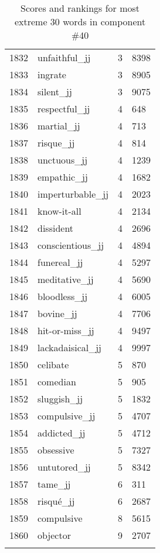 \begin{longtable}[!htbp]{| rlr@{.}l |}
    1832 & unfaithful\_jj & 3 & 8398 \\
    1833 & ingrate & 3 & 8905 \\
    1834 & silent\_jj & 3 & 9075 \\
    1835 & respectful\_jj & 4 & 648 \\
    1836 & martial\_jj & 4 & 713 \\
    1837 & risque\_jj & 4 & 814 \\
    1838 & unctuous\_jj & 4 & 1239 \\
    1839 & empathic\_jj & 4 & 1682 \\
    1840 & imperturbable\_jj & 4 & 2023 \\
    1841 & know-it-all & 4 & 2134 \\
    1842 & dissident & 4 & 2696 \\
    1843 & conscientious\_jj & 4 & 4894 \\
    1844 & funereal\_jj & 4 & 5297 \\
    1845 & meditative\_jj & 4 & 5690 \\
    1846 & bloodless\_jj & 4 & 6005 \\
    1847 & bovine\_jj & 4 & 7706 \\
    1848 & hit-or-miss\_jj & 4 & 9497 \\
    1849 & lackadaisical\_jj & 4 & 9997 \\
    1850 & celibate & 5 & 870 \\
    1851 & comedian & 5 & 905 \\
    1852 & sluggish\_jj & 5 & 1832 \\
    1853 & compulsive\_jj & 5 & 4707 \\
    1854 & addicted\_jj & 5 & 4712 \\
    1855 & obsessive & 5 & 7327 \\
    1856 & untutored\_jj & 5 & 8342 \\
    1857 & tame\_jj & 6 & 311 \\
    1858 & risqué\_jj & 6 & 2687 \\
    1859 & compulsive & 8 & 5615 \\
    1860 & objector & 9 & 2707 \\
    \hline
    \caption{Scores and rankings for most extreme 30 words in component \#40} \\
\end{longtable}
